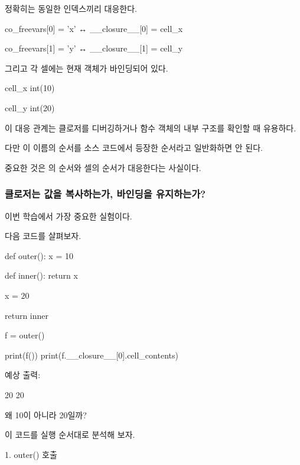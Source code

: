 정확히는 동일한 인덱스끼리 대응한다.

\begin{dhksmry}[centered]
co_freevars[0] = 'x'  ↔  __closure__[0] = cell_x

co_freevars[1] = 'y'  ↔  __closure__[1] = cell_y
\end{dhksmry}

그리고 각 셀에는 현재 객체가 바인딩되어 있다.

\begin{dhksmry}[centered]
cell_x \ra int(10)

cell_y \ra int(20)
\end{dhksmry}

이 대응 관계는 클로저를 디버깅하거나 함수 객체의 내부 구조를 확인할 때 유용하다.

다만 이 이름의 순서를 소스 코드에서 등장한 순서라고 일반화하면 안 된다.

중요한 것은 의 순서와 셀의 순서가 대응한다는 사실이다.

\subsubsection{클로저는 값을 복사하는가, 바인딩을 유지하는가?}

이번 학습에서 가장 중요한 실험이다.

다음 코드를 살펴보자.

\begin{dhkcode}
def outer():
    x = 10

    def inner():
        return x

    x = 20

    return inner


f = outer()

print(f())
print(f.__closure__[0].cell_contents)
\end{dhkcode}

예상 출력:

\begin{dhkzsh}
20
20
\end{dhkzsh}

왜 10이 아니라 20일까?

이 코드를 실행 순서대로 분석해 보자.

\begin{dhknote}
\begin{dhksmry}[centered]
1. outer() 호출
\end{dhksmry}
\end{dhknote}

